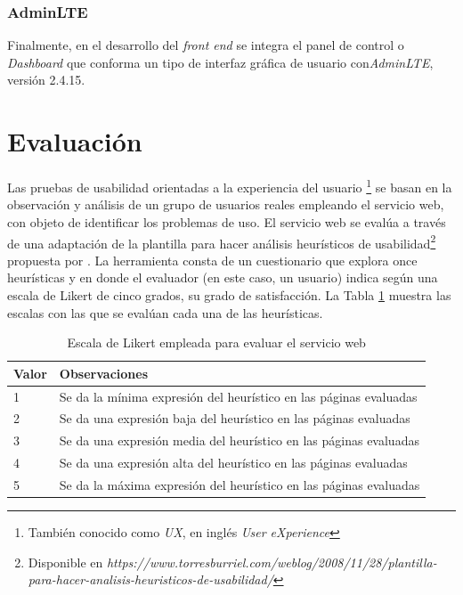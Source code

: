 \subsubsection{AdminLTE}
Finalmente, en el desarrollo del \emph{front end} se integra el panel de control o \emph{Dashboard} que conforma un tipo de interfaz gr\'afica de usuario con\emph{AdminLTE},  versi\'on 2.4.15.

\section{Evaluaci\'on}

Las pruebas de usabilidad orientadas a la experiencia del usuario \footnote{Tambi\'en conocido como \emph{UX}, en ingl\'es \emph{User eXperience}} se basan en la observaci\'on y an\'alisis de un grupo de usuarios reales empleando el servicio web, con objeto de identificar los problemas de uso. El servicio web se eval\'ua a trav\'es de una adaptaci\'on de la plantilla para hacer an\'alisis heur\'isticos de usabilidad\footnote{Disponible en \emph{https://www.torresburriel.com/weblog/2008/11/28/plantilla-para-hacer-analisis-heuristicos-de-usabilidad/}} propuesta por \cite{OnceHeuristicas}. La herramienta consta de un cuestionario que explora once heur\'isticas y en donde el evaluador (en este caso, un usuario) indica seg\'un una escala de Likert de cinco grados, su grado de satisfacci\'on. La Tabla \ref{tablaEscalasLikert} muestra las escalas con las que se eval\'uan cada una de las heur\'isticas.\newline

\begin{table}[htbp]
    \begin{center}
    \caption{Escala de Likert empleada para evaluar el servicio web}
    \begin{tabular}{| p{1.5cm}| p{11cm} |}
    \hline
    \centering \textbf{Valor } & \textbf{Observaciones} \\
    \hline \hline
    1 & Se da la m\'inima expresi\'on del heur\'istico en las p\'aginas evaluadas \\ \hline
    2 & Se da una expresi\'on baja del heur\'istico en las p\'aginas evaluadas \\ \hline
    3 & Se da una expresi\'on media del heur\'istico en las p\'aginas evaluadas \\ \hline
    4 & Se da una expresi\'on alta del heur\'istico en las p\'aginas evaluadas \\ \hline
    5 & Se da la m\'axima expresi\'on del heur\'istico en las p\'aginas evaluadas \\ \hline
    \end{tabular}
    \label{tablaEscalasLikert}
    \end{center}
\end{table}

